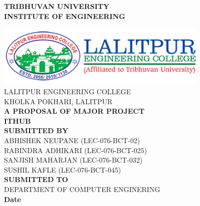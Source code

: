 \begin{center}

    \thispagestyle{empty}
    {\fontsize{16 pt}{12} \selectfont\textbf{TRIBHUVAN UNIVERSITY} \\
        \textbf{INSTITUTE OF ENGINEERING}} \\
    \vspace{0.3 in}

    \includegraphics[width= 4in ]{img/leclogo21.png} \\
    \vspace{0.05 in}
    LALITPUR ENGINEERING COLLEGE \\
    KHOLKA POKHARI, LALITPUR \\

    \vspace{0.5 in}
    \textbf{ A PROPOSAL OF MAJOR PROJECT}\\
    {\fontsize{14 pt}{12} \selectfont \textbf{ITHUB}}\\
    \vspace{1.1 in}
    \textbf{ SUBMITTED BY}  \\
    ABHISHEK NEUPANE (LEC-076-BCT-02)   \\
    RABINDRA ADHIKARI (LEC-076-BCT-025) \\
    SANJISH MAHARJAN (LEC-076-BCT-032)  \\
    SUSHIL KAFLE (LEC-076-BCT-045)  \\
    \vspace{1.1 in}
    \textbf{ SUBMITTED TO}  \\
    DEPARTMENT OF COMPUTER ENGINERING \\
    \vspace{0.5 in}
    \textbf{Date} \\
\end{center}